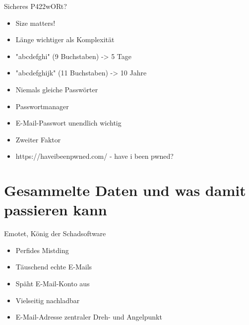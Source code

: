 \documentclass[10pt]{beamer}
\begin{document}
%
%
\begin{frame}[fragile]{Sicheres P422wORt?}
\begin{itemize}
    \item Size matters!
    \item Länge wichtiger als Komplexität
    \item "abcdefghi" (9 Buchstaben) -> \alert{5 Tage}
    \item "abcdefghijk" (11 Buchstaben) -> \alert{10 Jahre}
    \item Niemals gleiche Passwörter
    \item \alert{Passwortmanager}
    \item \alert{E-Mail-Passwort unendlich wichtig}
    \item \alert{Zweiter Faktor}
    \item \alert{https://haveibeenpwned.com/ - have i been pwned?}
  \end{itemize}
\end{frame}

\section{Gesammelte Daten und was damit passieren kann}

%
%
\begin{frame}[fragile]{Emotet, König der Schadsoftware}
\begin{itemize}
    \item Perfides Mistding
    \item Täuschend echte E-Mails
    \item Späht E-Mail-Konto aus
    \item Vielseitig nachladbar
    \item E-Mail-Adresse zentraler Dreh- und Angelpunkt
  \end{itemize}
\end{frame}
\end{document}

